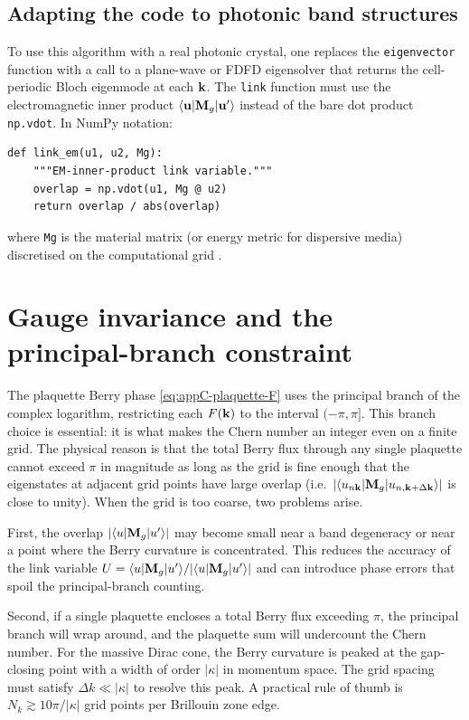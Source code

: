 \subsection{Adapting the code to photonic band structures}
\label{sec:appC-adapting}

To use this algorithm with a real photonic crystal, one replaces the
\verb|eigenvector| function with a call to a plane-wave or FDFD
eigensolver that returns the cell-periodic Bloch eigenmode at each
$\mathbf{k}$.  The \verb|link| function must use the electromagnetic inner
product $\langle\mathbf{u}|\mathbf{M}_g|\mathbf{u}'\rangle$ instead of the
bare dot product \verb|np.vdot|.  In NumPy notation:

\begin{verbatim}
def link_em(u1, u2, Mg):
    """EM-inner-product link variable."""
    overlap = np.vdot(u1, Mg @ u2)
    return overlap / abs(overlap)
\end{verbatim}

where \verb|Mg| is the material matrix (or energy metric for dispersive
media) discretised on the computational grid
\cite{gangaraj2016berry,silveirinha2016bulk,raman2010photonic}.

\section{Gauge invariance and the principal-branch constraint}
\label{sec:appC-gauge}

The plaquette Berry phase \eqref{eq:appC-plaquette-F} uses the
principal branch of the complex logarithm, restricting each
$F(\mathbf{k})$ to the interval $(-\pi,\pi]$.  This branch choice is
essential: it is what makes the Chern number an integer even on a
finite grid.  The physical reason is that the total Berry flux through
any single plaquette cannot exceed $\pi$ in magnitude as long as the
grid is fine enough that the eigenstates at adjacent grid points have
large overlap (i.e.\ $|\langle u_{n\mathbf{k}}|\mathbf{M}_g|u_{n,\mathbf{k}+\Delta\mathbf{k}}\rangle|$
is close to unity).  When the grid is too coarse, two problems arise.

First, the overlap $|\langle u|\mathbf{M}_g|u'\rangle|$ may become small
near a band degeneracy or near a point where the Berry curvature is
concentrated.  This reduces the accuracy of the link variable
$U=\langle u|\mathbf{M}_g|u'\rangle/|\langle u|\mathbf{M}_g|u'\rangle|$ and can
introduce phase errors that spoil the principal-branch counting.

Second, if a single plaquette encloses a total Berry flux exceeding
$\pi$, the principal branch will wrap around, and the plaquette sum
will undercount the Chern number.  For the massive Dirac cone, the
Berry curvature is peaked at the gap-closing point with a width of
order $|\kappa|$ in momentum space.  The grid spacing must satisfy
$\Delta k \ll |\kappa|$ to resolve this peak.  A practical rule of
thumb is $N_k\gtrsim 10\pi/|\kappa|$ grid points per Brillouin zone
edge.

